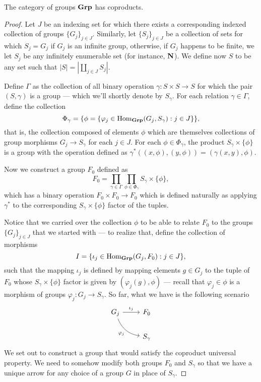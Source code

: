 \begin{proposition}
\label{prop:coprod-grp}
The category of groups \({\textbf{Grp}}\) has coproducts.
\end{proposition}

\begin{proof}
Let \(J\) be an indexing set for which there exists a corresponding indexed
collection of groups \(\{G_{j}\}_{j \in J}\). Similarly, let \(\{S_{j}\}_{j \in J}\)
be a collection of sets for which \(S_j = G_j\) if \(G_j\) is an infinite group,
otherwise, if \(G_j\) happens to be finite, we let \(S_j\) be any infinitely
enumerable set (for instance, \(\mathbf{N}\)). We define now \(S\) to be any set such
that \(|S| = |\coprod_{j \in J} S_{j}|\).

Define \(\Gamma\) as the collection of all binary operation \(\gamma: S \times S
\to S\) for which the pair \((S, \gamma)\) is a group --- which we'll shortly
denote by \(S_{\gamma}\). For each relation \(\gamma \in \Gamma\), define the
collection
\[
  \Phi_{\gamma} =
  \{\phi = \{\varphi_{j} \in \operatorname{Hom}_{{\textbf{Grp}}}(G_j, S_\gamma) : j \in J\}\},
\]
that is, the collection composed of elements \(\phi\) which are themselves
collections of group morphisms \(G_j \to S_\gamma\) for each \(j \in J\). For
each \(\phi \in \Phi_{\gamma}\), the product \(S_{\gamma} \times \{\phi\}\) is a
group with the operation defined as \(\gamma^{*}((x, \phi), (y, \phi)) =
(\gamma(x, y), \phi)\).

Now we construct a group \(F_0\) defined as
\[
  F_0 = \prod_{\gamma \in \Gamma}
  \prod_{\phi \in \Phi_{\gamma}} S_{\gamma} \times \{\phi\},
\]
which has a binary operation \(F_0 \times F_0 \to F_0\) which is defined
naturally as applying \(\gamma^{*}\) to the corresponding \(S_{\gamma} \times
\{\phi\}\) factor of the tuples.

Notice that we carried over the collection \(\phi\) to be able to relate \(F_0\)
to the groups \(\{G_{j}\}_{j \in J}\) that we started with --- to realize that,
define the collection of morphisms
\[
  I = \{\iota_{j} \in \operatorname{Hom}_{{\textbf{Grp}}}(G_j, F_0) : j \in J\},
\]
such that the mapping \(\iota_j\) is defined by mapping elements \(g \in G_j\)
to the tuple of \(F_0\) whose \(S_{\gamma} \times \{\phi\}\) factor is given by
\((\varphi_j(g), \phi)\) --- recall that \(\varphi_j \in \phi\) is a morphism of
groups \(\varphi_j: G_j \to S_{\gamma}\). So far, what we have is the following
scenario
\[
  \begin{tikzcd}
    G_j \ar[r, "\iota_j"] \ar[rd, bend right, swap, "\varphi_j"] &F_0 \\
    &S_\gamma
  \end{tikzcd}
\]
We set out to construct a group that would satisfy the coproduct universal
property. We need to somehow modify both groups \(F_0\) and \(S_{\gamma}\) so
that we have a unique arrow for any choice of a group \(G\) in place of
\(S_{\gamma}\).


\end{proof}
